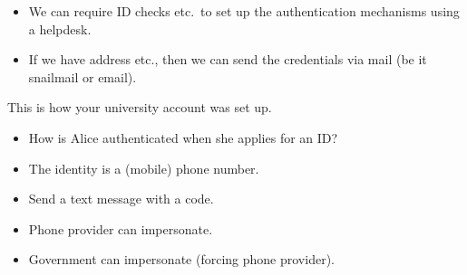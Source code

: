 \begin{frame}
  \begin{solution}
    \begin{itemize}
      \item We can require ID checks etc.\ to set up the authentication 
        mechanisms using a helpdesk.

        \pause{}

      \item If we have address etc., then we can send the credentials via mail 
        (be it snailmail or email).

    \end{itemize}
  \end{solution}

  \pause{}

  \begin{example}
    This is how your university account was set up.
  \end{example}
\end{frame}

\begin{frame}
  \begin{exercise}
    \begin{itemize}
      \item How is Alice authenticated when she applies for an ID?
    \end{itemize}
  \end{exercise}
\end{frame}

\begin{frame}
  \begin{example}
    \begin{itemize}
      \item The identity is a (mobile) phone number.
      \item Send a text message with a code.
    \end{itemize}
  \end{example}

  \pause{}

  \begin{remark}
    \begin{itemize}
      \item Phone provider can impersonate.
      \item Government can impersonate (forcing phone provider).
    \end{itemize}
  \end{remark}
\end{frame}

